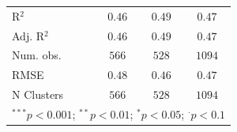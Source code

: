 \begin{table}[!htpb]
\begin{center}
{\begin{tabular}{l c c c}
\hline
R$^2$                                                          & $0.46$       & $0.49$        & $0.47$        \\
Adj. R$^2$                                                     & $0.46$       & $0.49$        & $0.47$        \\
Num. obs.                                                      & $566$        & $528$         & $1094$        \\
RMSE                                                           & $0.48$       & $0.46$        & $0.47$        \\
N Clusters                                                     & $566$        & $528$         & $1094$        \\
\hline
\multicolumn{4}{l}{\scriptsize{$^{***}p<0.001$; $^{**}p<0.01$; $^{*}p<0.05$; $^{\cdot}p<0.1$}}
\end{tabular}
}
\label{tab:tripleinteraction-mainspecification-harm-weighted-clusteredses-ld}
\end{center}
\end{table}
